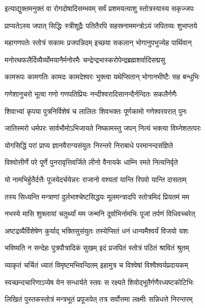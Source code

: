 \twolineshloka
{इत्याद्युक्तमनुक्तं वा रोगदोषादिसम्भवम्}
{सर्वं प्रशमयत्याशु स्तोत्रस्यास्य सकृज्जपः}%

\twolineshloka
{प्राप्यतेऽस्य जपात् सिद्धिः स्त्रीशूद्रैः पतितैरपि}
{सहस्रनाममन्त्रोऽयं जपितव्यः शुभाप्तये}%

\twolineshloka
{महागणपतेः स्तोत्रं सकामः प्रजपन्निदम्}
{इच्छया सकलान् भोगानुपभुज्येह पार्थिवान्}%

\twolineshloka
{मनोरथफलैर्दिव्यैर्व्योमयानैर्मनोरमैः}
{चन्द्रेन्द्रभास्करोपेन्द्रब्रह्मशर्वादिसद्मसु}%

\twolineshloka
{कामरूपः कामगतिः कामदः कामदेश्वरः}
{भुक्त्वा यथेप्सितान् भोगानभीष्टैः सह बन्धुभिः}%

\twolineshloka
{गणेशानुचरो भूत्वा गणो गणपतिप्रियः}
{नन्दीश्वरादिसानन्दैर्नन्दितः सकलैर्गणैः}%

\twolineshloka
{शिवाभ्यां कृपया पुत्रनिर्विशेषं च लालितः}
{शिवभक्तः पूर्णकामो गणेश्वरवरात् पुनः}%

\twolineshloka
{जातिस्मरो धर्मपरः सार्वभौमोऽभिजायते}
{निष्कामस्तु जपन् नित्यं भक्त्या विघ्नेशतत्परः}%

\twolineshloka
{योगसिद्धिं परां प्राप्य ज्ञानवैराग्यसंयुतः}
{निरन्तरे निराबाधे परमानन्दसंज्ञिते}%

\twolineshloka
{विश्वोत्तीर्णे परे पूर्णे पुनरावृत्तिवर्जिते}
{लीनो वैनायके धाम्नि रमते नित्यनिर्वृते}%

\twolineshloka
{यो नामभिर्हुतैर्दत्तैः पूजयेदर्चयेन्नरः}
{राजानो वश्यतां यान्ति रिपवो यान्ति दासताम्}%

\twolineshloka
{तस्य सिध्यन्ति मन्त्राणां दुर्लभाश्चेष्टसिद्धयः}
{मूलमन्त्रादपि स्तोत्रमिदं प्रियतमं मम}%

\twolineshloka
{नभस्ये मासि शुक्लायां चतुर्थ्यां मम जन्मनि}
{दूर्वाभिर्नामभिः पूजां तर्पणं विधिवच्चरेत्}%

\twolineshloka
{अष्टद्रव्यैर्विशेषेण कुर्याद् भक्तिसुसंयुतः}
{तस्येप्सितं धनं धान्यमैश्वर्यं विजयो यशः}%

\twolineshloka
{भविष्यति न सन्देहः पुत्रपौत्रादिकं सुखम्}
{इदं प्रजपितं स्तोत्रं पठितं श्रावितं श्रुतम्}%

\twolineshloka
{व्याकृतं चर्चितं ध्यातं विमृष्टमभिवन्दितम्}
{इहामुत्र च विश्वेषां विश्वैश्वर्यप्रदायकम्}%

\twolineshloka
{स्वच्छन्दचारिणाऽप्येष येन सन्धार्यते स्तवः}
{स रक्ष्यते शिवोद्भूतैर्गणैरध्यष्टकोटिभिः}%

\twolineshloka
{लिखितं पुस्तकस्तोत्रं मन्त्रभूतं प्रपूजयेत्}
{तत्र सर्वोत्तमा लक्ष्मीः सन्निधत्ते निरन्तरम्}%

